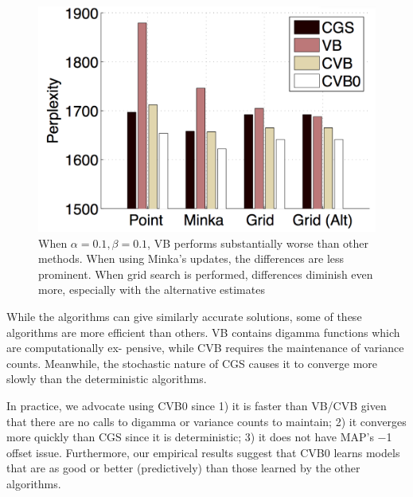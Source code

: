 \begin{figure}
  \centering
    \hspace*{-1.5cm}\includegraphics[height=0.33\textheight]{./Chap1/plots/figs/fig8.png}
  \caption{When $\alpha = 0.1, \beta = 0.1$, VB performs substantially worse than other methods. When using Minka’s updates, the differences are less prominent. When grid search is performed, differences diminish even more, especially with the alternative estimates}
  \label{fig:chap1-fig8}
\end{figure}

While the algorithms can give similarly accurate solutions, some of these algorithms are more efficient than others. VB contains digamma functions which are computationally ex- pensive, while CVB requires the maintenance of variance counts. Meanwhile, the stochastic nature of CGS causes it to converge more slowly than the deterministic algorithms.

In practice, we advocate using CVB0 since 1) it is faster than VB/CVB given that there are no calls to digamma or variance counts to maintain; 2) it converges more quickly than CGS since it is deterministic; 3) it does not have MAP’s −1 offset issue. Furthermore, our empirical results suggest that CVB0 learns models that are as good or better (predictively) than those learned by the other algorithms.

